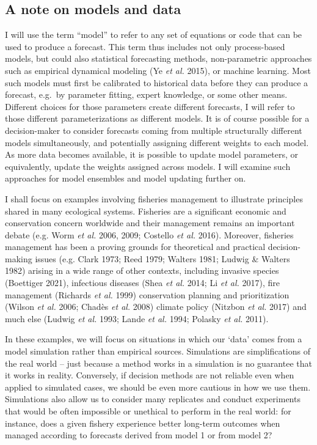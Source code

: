 \documentclass[3p]{elsarticle} %
\begin{document}
\hypertarget{a-note-on-models-and-data}{%
\subsection{A note on models and data}\label{a-note-on-models-and-data}}

I will use the term ``model'' to refer to any set of equations or code
that can be used to produce a forecast. This term thus includes not only
process-based models, but could also statistical forecasting methods,
non-parametric approaches such as empirical dynamical modeling (Ye
\emph{et al.} 2015), or machine learning. Most such models must first be
calibrated to historical data before they can produce a forecast,
e.g.~by parameter fitting, expert knowledge, or some other means.
Different choices for those parameters create different forecasts, I
will refer to those different parameterizations as different models. It
is of course possible for a decision-maker to consider forecasts coming
from multiple structurally different models simultaneously, and
potentially assigning different weights to each model. As more data
becomes available, it is possible to update model parameters, or
equivalently, update the weights assigned across models. I will examine
such approaches for model ensembles and model updating further on.

I shall focus on examples involving fisheries management to illustrate
principles shared in many ecological systems. Fisheries are a
significant economic and conservation concern worldwide and their
management remains an important debate (e.g. Worm \emph{et al.} 2006,
2009; Costello \emph{et al.} 2016). Moreover, fisheries management has
been a proving grounds for theoretical and practical decision-making
issues (e.g. Clark 1973; Reed 1979; Walters 1981; Ludwig \& Walters
1982) arising in a wide range of other contexts, including invasive
species (Boettiger 2021), infectious diseases (Shea \emph{et al.} 2014;
Li \emph{et al.} 2017), fire management (Richards \emph{et al.} 1999)
conservation planning and prioritization (Wilson \emph{et al.} 2006;
Chadès \emph{et al.} 2008) climate policy (Nitzbon \emph{et al.} 2017)
and much else (Ludwig \emph{et al.} 1993; Lande \emph{et al.} 1994;
Polasky \emph{et al.} 2011).

In these examples, we will focus on situations in which our `data' comes
from a model simulation rather than empirical sources. Simulations are
simplifications of the real world -- just because a method works in a
simulation is no guarantee that it works in reality. Conversely, if
decision methods are not reliable even when applied to simulated cases,
we should be even more cautious in how we use them. Simulations also
allow us to consider many replicates and conduct experiments that would
be often impossible or unethical to perform in the real world: for
instance, does a given fishery experience better long-term outcomes when
managed according to forecasts derived from model 1 or from model 2?
\end{document}
